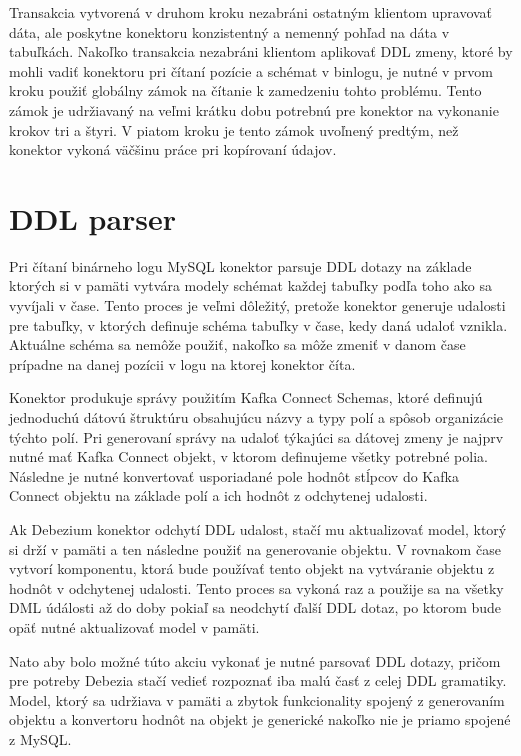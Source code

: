 Transakcia vytvorená v druhom kroku nezabráni ostatným klientom upravovať dáta, ale poskytne konektoru konzistentný a nemenný pohľad na dáta v tabuľkách. Nakoľko transakcia nezabráni klientom aplikovať DDL zmeny, ktoré by mohli vadiť konektoru pri čítaní pozície a schémat v binlogu, je nutné v prvom kroku použiť globálny zámok na čítanie k zamedzeniu tohto problému. Tento zámok je udržiavaný na veľmi krátku dobu potrebnú pre konektor na vykonanie krokov tri a štyri. V piatom kroku je tento zámok uvoľnený predtým, než konektor vykoná väčšinu práce pri kopírovaní údajov.


\section{DDL parser}
Pri čítaní binárneho logu MySQL konektor parsuje DDL dotazy na základe ktorých si v pamäti vytvára modely schémat každej tabuľky podľa toho ako sa vyvíjali v čase. Tento proces je veľmi dôležitý, pretože konektor generuje udalosti pre tabuľky, v ktorých definuje schéma tabuľky v čase, kedy daná udaloť vznikla. Aktuálne schéma sa nemôže použiť, nakoľko sa môže zmeniť v danom čase prípadne na danej pozícii v logu na ktorej konektor číta. 

Konektor produkuje správy použitím Kafka Connect Schemas, ktoré definujú jednoduchú dátovú štruktúru obsahujúcu názvy a typy polí a spôsob organizácie týchto polí. Pri generovaní správy na udaloť týkajúci sa dátovej zmeny je najprv nutné mať Kafka Connect  objekt, v ktorom definujeme všetky potrebné polia. Následne je nutné konvertovať usporiadané pole hodnôt stĺpcov do Kafka Connect  objektu na základe polí a ich hodnôt z odchytenej udalosti.

Ak Debezium konektor odchytí DDL udalost, stačí mu aktualizovať model, ktorý si drží v pamäti a ten následne použiť na generovanie  objektu. V rovnakom čase vytvorí komponentu, ktorá bude používať tento  objekt na vytváranie  objektu z hodnôt v odchytenej udalosti. Tento proces sa vykoná raz a použije sa na všetky DML údálosti až do doby pokiaľ sa neodchytí ďalší DDL dotaz, po ktorom bude opäť nutné aktualizovať model v pamäti.

Nato aby bolo možné túto akciu vykonať je nutné parsovať DDL dotazy, pričom pre potreby Debezia stačí vedieť rozpoznať iba malú časť z celej DDL gramatiky. Model, ktorý sa udržiava v pamäti a zbytok funkcionality spojený z generovaním  objektu a konvertoru hodnôt na  objekt je generické nakoľko nie je priamo spojené z MySQL.

